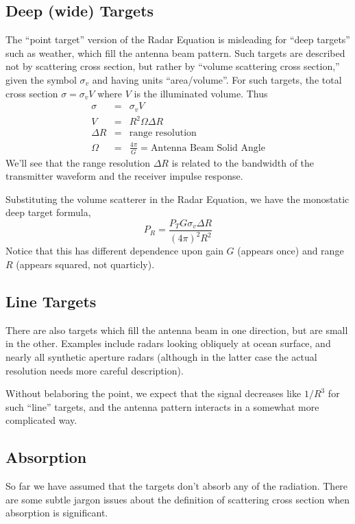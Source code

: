 \subsection{Deep (wide) Targets}

The ``point target'' version of the Radar Equation is misleading for
``deep targets'' such as weather, which fill the antenna beam
pattern.  Such targets are described not by scattering cross section,
but rather by ``volume scattering cross section,'' given the symbol
$\sigma_v$ and having units ``area/volume''.  For such targets, the
total cross section $\sigma = \sigma_v V$ where $V$ is the illuminated
volume.  Thus
\begin{eqnarray}
\sigma &=& \sigma_v V \\
V &=& R^2 \Omega \Delta R \\
\Delta R &=& \textrm{range resolution} \\
\Omega &=& \frac{4\pi}{G} = \textrm{Antenna Beam Solid Angle}
\end{eqnarray}
We'll see that the range resolution $\Delta R$ is related to the
bandwidth of the transmitter waveform and the receiver impulse
response.

Substituting the volume scatterer in the Radar Equation, we have the
monostatic deep target formula,
\begin{equation}
P_R = \frac{P_T G \sigma_v \Delta R}{(4\pi)^2 R^2}
\end{equation}
Notice that this has different dependence upon gain $G$ (appears once)
and range $R$ (appears squared, not quarticly).

\subsection{Line Targets}

There are also targets which fill the antenna beam in one direction,
but are small in the other.  Examples include radars looking obliquely
at ocean surface, and nearly all synthetic aperture radars (although
in the latter case the actual resolution needs more careful
description).

Without belaboring the point, we expect that the signal decreases like
$1/R^3$ for such ``line'' targets, and the antenna pattern interacts
in a somewhat more complicated way.

\subsection{Absorption}
So far we have assumed that the targets don't absorb any of the
radiation.  There are some subtle jargon issues about the definition
of scattering cross section when absorption is significant.

